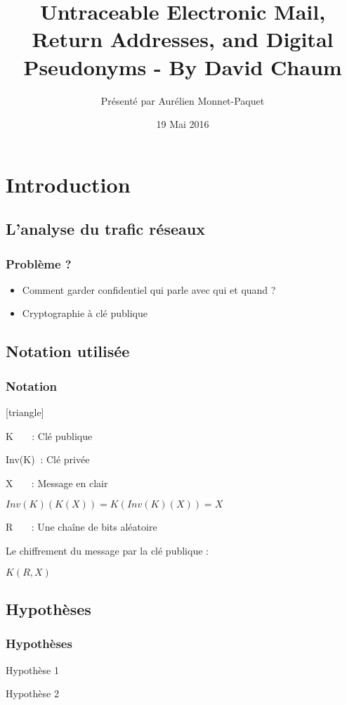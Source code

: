 \documentclass{beamer}
\title{Untraceable Electronic Mail, Return Addresses, and Digital Pseudonyms - By David Chaum}
\author{Présenté par Aurélien Monnet-Paquet}
\institute{www.inria.fr}
\date{19 Mai 2016}
\begin{document}
\begin{frame}
\titlepage
\end{frame}

\section{Introduction}
\subsection{L'analyse du trafic réseaux}
\begin{frame}
\frametitle{Problème ?}
\begin{itemize}
[triangle]
\item Comment garder confidentiel qui parle avec qui et quand ?
\pause
\item Cryptographie à clé publique
\end{itemize}
\end{frame}

\subsection{Notation utilisée}
\begin{frame}
\frametitle{Notation}
\begin{itemize}
[triangle]
\item K $~~~~~~~$: Clé publique
\item Inv(K) $~$: Clé privée
\item X $~~~~~~~$: Message en clair
\pause
\item $Inv(K)( K( X ) ) = K( Inv(K)( X ) ) = X$
\pause
\item R $~~~~~~~$: Une chaîne de bits aléatoire
\pause
\item Le chiffrement du message par la clé publique :
\begin{center}
\item $K( R, X )$
\end{center}
\end{itemize}
\end{frame}

\subsection{Hypothèses}
\begin{frame}
\frametitle{Hypothèses}
\begin{block}{}
Hypothèse 1
\end{block}
\begin{block}{}
Hypothèse 2
\end{block}
\end{frame}
\end{document}
